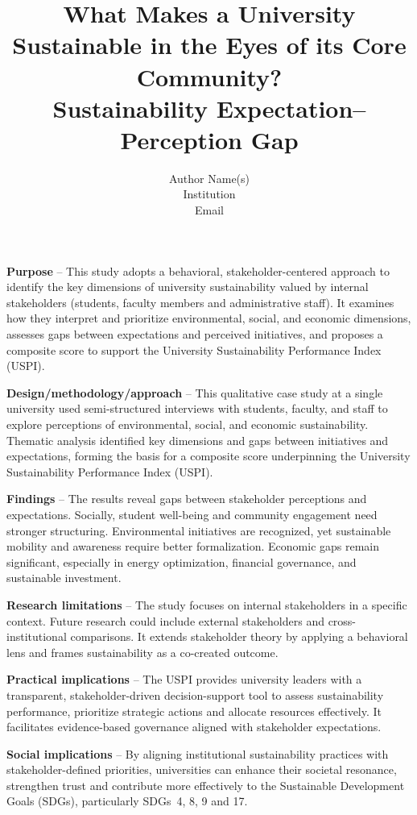 \documentclass[12pt,a4paper]{article}
\title{What Makes a University Sustainable in the Eyes of its Core Community?\\
\large Sustainability Expectation--Perception Gap}
\author{Author Name(s)\\
Institution\\
Email}
\date{}
\begin{document}
\maketitle



\textbf{Purpose} -- This study adopts a behavioral, stakeholder-centered approach to identify the key dimensions of university sustainability valued by internal stakeholders (students, faculty members and administrative staff). It examines how they interpret and prioritize environmental, social, and economic dimensions, assesses gaps between expectations and perceived initiatives, and proposes a composite score to support the University Sustainability Performance Index (USPI).

\textbf{Design/methodology/approach} -- This qualitative case study at a single university used semi-structured interviews with students, faculty, and staff to explore perceptions of environmental, social, and economic sustainability. Thematic analysis identified key dimensions and gaps between initiatives and expectations, forming the basis for a composite score underpinning the University Sustainability Performance Index (USPI).

\textbf{Findings} -- The results reveal gaps between stakeholder perceptions and expectations. Socially, student well-being and community engagement need stronger structuring. Environmental initiatives are recognized, yet sustainable mobility and awareness require better formalization. Economic gaps remain significant, especially in energy optimization, financial governance, and sustainable investment.

\textbf{Research limitations} -- The study focuses on internal stakeholders in a specific context. Future research could include external stakeholders and cross-institutional comparisons. It extends stakeholder theory by applying a behavioral lens and frames sustainability as a co-created outcome.

\textbf{Practical implications} -- The USPI provides university leaders with a transparent, stakeholder-driven decision-support tool to assess sustainability performance, prioritize strategic actions and allocate resources effectively. It facilitates evidence-based governance aligned with stakeholder expectations.

\textbf{Social implications} -- By aligning institutional sustainability practices with stakeholder-defined priorities, universities can enhance their societal resonance, strengthen trust and contribute more effectively to the Sustainable Development Goals (SDGs), particularly SDGs~4, 8, 9 and 17.
\end{document}
